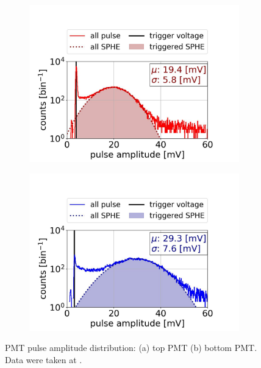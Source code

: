 \begin{figure}[!p]
	\centering
	\begin{subfigure}[b]{\twofigurewidth}
		\centering
		\includegraphics[width=\textwidth,clip,trim={0 0 0 0},angle=0,origin=c]{Figures/GasTest/DatasetQuality/topPMTTriggerEfficiency65831.jpg}
		\caption{}
		\label{fig:PMTTriggerEff top}
	\end{subfigure}
	\begin{subfigure}[b]{\textwidth}
		\centering
		\includegraphics[width=\twofigurewidth,clip,trim={0 0 0 0}]{Figures/GasTest/DatasetQuality/botPMTTriggerEfficiency65831.jpg}
		\caption{}
		\label{fig:PMTTriggerEff bottom}
	\end{subfigure}
	\caption[PMT pulse amplitude distribution.]{PMT pulse amplitude distribution: (a) top PMT (b) bottom PMT. Data were taken at .}
	\label{fig:PMTTriggerEff}
\end{figure}%

